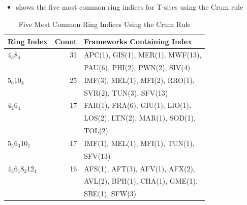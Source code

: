 \documentclass[11pt]{article}
\begin{document}
\newpage
\begin{itemize}
\item {} shows the five most common ring indices for T-sites using the Crum rule
\end{itemize}
\begin{table}[htbp]
\caption{Five Most Common Ring Indices Using the Crum Rule \label{tab:crum-ts}}
\centering
\begin{tabular}{lrl}
Ring Index & Count & Frameworks Containing Index\\
\hline
4\(_{\text{3}}\)\textbullet{}8\(_{\text{4}}\) & 31 & APC(1), GIS(1), MER(1), MWF(13),\\
 &  & PAU(6), PHI(2), PWN(2), SIV(4)\\
5\(_{\text{6}}\)\textbullet{}10\(_{\text{4}}\) & 25 & IMF(3), MEL(1), MFI(2), RRO(1),\\
 &  & SVR(2), TUN(3), SFV(13)\\
4\(_{\text{2}}\)\textbullet{}6\(_{\text{4}}\) & 17 & FAR(1), FRA(6), GIU(1), LIO(1),\\
 &  & LOS(2), LTN(2), MAR(1), SOD(1),\\
 &  & TOL(2)\\
5\(_{\text{5}}\)\textbullet{}6\(_{\text{3}}\)\textbullet{}10\(_{\text{1}}\) & 17 & IMF(1), MEL(1), MFI(1), TUN(1),\\
 &  & SFV(13)\\
4\(_{\text{3}}\)\textbullet{}6\(_{\text{1}}\)\textbullet{}8\(_{\text{2}}\)\textbullet{}12\(_{\text{1}}\) & 16 & AFS(1), AFT(3), AFV(1), AFX(2),\\
 &  & AVL(2), BPH(1), CHA(1), GME(1),\\
 &  & SBE(1), SFW(3)\\
\end{tabular}
\end{table}
\end{document}
